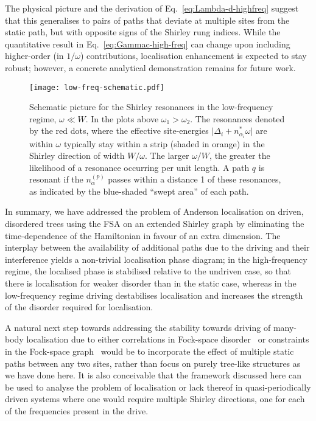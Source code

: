\documentclass[aps,prl,twocolumn,superscriptaddress,nobalancelastpage,longbibliography]{revtex4-2}
\begin{document}
The physical picture and the derivation of Eq.~\ref{eq:Lambda-d-highfreq} suggest that this generalises to pairs of paths that deviate at multiple sites from the static path, but with opposite signs of the Shirley rung indices.
While the quantitative result in Eq.~\ref{eq:Gammac-high-freq} can change upon including higher-order (in $1/\omega$) contributions, localisation enhancement is expected to stay robust; however, a concrete analytical demonstration remains  for future work.


\begin{figure}
    \texttt{[image: low-freq-schematic.pdf]}
    \caption{Schematic picture for the Shirley resonances in the low-frequency regime, $\omega\ll W$. In the plots above $\omega_1>\omega_2$. The resonances denoted by the red dots, where the effective site-energies $\vert \Delta_i+n_{\alpha_i}^\ast\omega\vert$ are within $\omega$ typically stay within a strip (shaded in orange) in the Shirley direction of width $W/\omega$. The larger $\omega/W$, the greater the likelihood of a resonance occurring per unit length. A path $q$ is resonant if the $n_\alpha^{(p)}$ passes within a distance 1 of these resonances, as indicated by the blue-shaded ``swept area'' of each path.}
    \label{fig:low-freq-schematic}
\end{figure}

In summary, we have addressed the problem of Anderson localisation on driven, disordered trees using the FSA on an extended Shirley graph by eliminating the time-dependence of the Hamiltonian in favour of an extra dimension.
The interplay between the availability of additional paths due to the driving and their interference yields a non-trivial localisation phase diagram; in the high-frequency regime, the localised phase is stabilised relative to the undriven case, so that there is localisation for weaker disorder than in the static case, whereas in the low-frequency regime driving destabilises localisation and increases the strength of the disorder required for localisation.


A natural next step towards addressing the stability towards driving of many-body localisation due to either correlations in Fock-space disorder~\cite{roy2020fock} or constraints in the Fock-space graph~\cite{roy2020strong} would be to incorporate the effect of multiple static paths between any two sites, rather than focus on purely tree-like structures as we have done here.
It is also conceivable that the framework discussed here can be used to analyse the problem of localisation or lack thereof in quasi-periodically driven systems where one would require multiple Shirley directions, one for each of the frequencies present in the drive.
\end{document}
